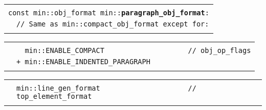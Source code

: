 \documentclass[12pt]{article}
\makeatletter
\newcommand{\TT}[1]{{\tt \bfseries #1}}
\newcommand{\ttindex}[1]{\index{#1@{\tt #1}}}
\newenvironment{indpar}[1][0.3in]%
	{\begin{list}{}%
		     {\setlength{\itemsep}{0in}%
		      \setlength{\topsep}{0in}%
		      \setlength{\parsep}{1ex}%
		      \setlength{\labelwidth}{#1}%
		      \setlength{\leftmargin}{#1}%
		      \addtolength{\leftmargin}{\labelsep}}%
	 \item}%
	{\end{list}}
\newcommand{\LABEL}[1]{\label{#1}}
\newlength{\ARGBREAKLENGTH}
\newcommand{\ARGBREAK}[1][\ARGBREAKLENGTH]{\\&\hspace*{#1}}
\newcommand{\MINKEY}[1]%
	   {\TT{#1}\ttindex{min::#1}\ttindex{#1}}
\makeatother
\begin{document}
\begin{indpar}[1em]

\begin{tabular}{r@{}l}\hspace*{0.1in} \\[-3ex]
\multicolumn{2}{l}{\tt const min::obj\_format
                   min::\MINKEY{paragraph\_obj\_format}:}%
\LABEL{MIN::PARAGRAPH_OBJ_FORMAT}\ARGBREAK
\verb|// Same as min::compact_obj_format except for:|\ARGBREAK
\end{tabular}

\vspace{-4ex}\begin{tabular}{r@{}l}\hspace*{0.1in}\ARGBREAK
\verb|  min::ENABLE_COMPACT                    // obj_op_flags|\ARGBREAK
\verb|+ min::ENABLE_INDENTED_PARAGRAPH|\ARGBREAK
\end{tabular}

\vspace{-4ex}\begin{tabular}{r@{}l}\hspace*{0.1in}\ARGBREAK
\verb|min::line_gen_format                     // top_element_format|\ARGBREAK
\end{tabular}

\end{indpar}
\end{document}
